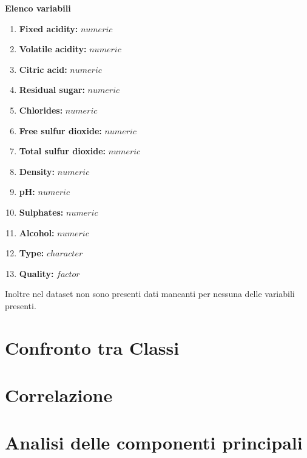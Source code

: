 \noindent
\textbf{Elenco variabili}
\begin{enumerate}
    \item \textbf{Fixed acidity:} $numeric$
    \item \textbf{Volatile acidity:} $numeric$
    \item \textbf{Citric acid:} $numeric$
    \item \textbf{Residual sugar:} $numeric$
    \item \textbf{Chlorides:} $numeric$
    \item \textbf{Free sulfur dioxide:} $numeric$
    \item \textbf{Total sulfur dioxide:} $numeric$
    \item \textbf{Density:} $numeric$
    \item \textbf{pH:} $numeric$
    \item \textbf{Sulphates:} $numeric$
    \item \textbf{Alcohol:} $numeric$
    \item \textbf{Type:} $character$
    \item \textbf{Quality:} $factor$
\end{enumerate}

\noindent
Inoltre nel dataset non sono presenti dati mancanti per nessuna delle variabili presenti.







\section{Confronto tra Classi}

\section{Correlazione}

\section{Analisi delle componenti principali}
